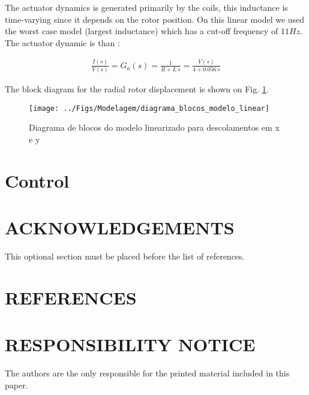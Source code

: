 \documentclass[10pt,fleqn,a4paper,twoside]{article}
\begin{document}
	
	The actuator dynamics is generated primarily by the coils,  this inductance is time-varying since it depends on the rotor position. On this linear model we used the worst case model (largest inductance) which has a cut-off frequency of $11Hz$. The actuator dynamic is than :
	
	\begin{align}
		\frac{I(s)}{V(s)} = G_a(s) = \frac{1}{R + L \, s} = \frac{V(s)}{4 + 0.056 \, s}
	\end{align}
	
	The block diagram for the radial rotor displacement is shown on Fig. \ref{fig:diagrama:blocos:modelo:linear}.
	
	\begin{figure}[th!]
		\centering
		\texttt{[image: ../Figs/Modelagem/diagrama\_blocos\_modelo\_linear]}
		\caption{Diagrama de blocos do modelo linearizado para descolamentos em x e y}
		\label{fig:diagrama:blocos:modelo:linear}
	\end{figure}
	
	\section{Control}
	
	\section{ACKNOWLEDGEMENTS}
	
	This optional section must be placed before the list of references.
	
	\section{REFERENCES} 
	
	
	\renewcommand{\refname}{}
	
	
	\section{RESPONSIBILITY NOTICE}
	
	The authors are the only responsible for the printed material included in this paper.
	
\end{document}
